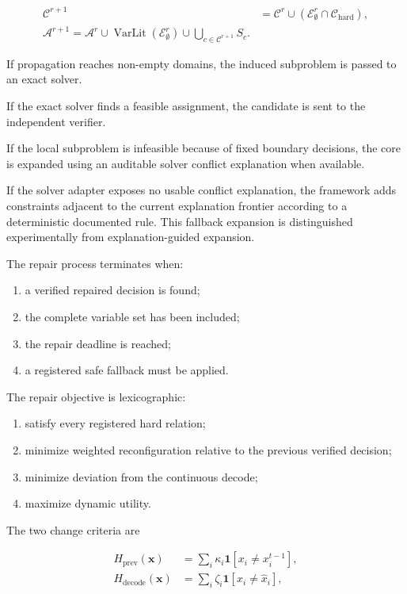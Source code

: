 \documentclass[pdflatex,sn-mathphys-num,iicol,oneside]{sn-jnl}
\begin{document}
\begin{align}
\mathcal{C}^{r+1}
&=
\mathcal{C}^{r}
\cup
\left(
\mathcal{E}_{\emptyset}^{r}
\cap
\mathcal{C}_{\mathrm{hard}}
\right),
\label{eq:constraint-expansion}\\
\mathcal A^{r+1} = \mathcal A^r \cup \operatorname{VarLit}(\mathcal E_\emptyset^r) \cup \bigcup_{c\in\mathcal C^{r+1}}S_c.
\label{eq:variable-expansion}
\end{align}

If propagation reaches non-empty domains, the induced subproblem is
passed to an exact solver.

If the exact solver finds a feasible assignment, the candidate is
sent to the independent verifier.

If the local subproblem is infeasible because of fixed boundary
decisions, the core is expanded using an auditable solver conflict
explanation when available.

If the solver adapter exposes no usable conflict explanation, the
framework adds constraints adjacent to the current explanation
frontier according to a deterministic documented rule. This fallback
expansion is distinguished experimentally from explanation-guided
expansion.

The repair process terminates when:

\begin{enumerate}
    \item a verified repaired decision is found;
    \item the complete variable set has been included;
    \item the repair deadline is reached;
    \item a registered safe fallback must be applied.
\end{enumerate}

The repair objective is lexicographic:

\begin{enumerate}
    \item satisfy every registered hard relation;
    \item minimize weighted reconfiguration relative to the previous
    verified decision;
    \item minimize deviation from the continuous decode;
    \item maximize dynamic utility.
\end{enumerate}

The two change criteria are

\begin{align}
H_{\mathrm{prev}}(\bm{x})
&=
\sum_i
\kappa_i
\mathbf{1}
[x_i\neq x_i^{t-1}],
\label{eq:previous-distance}\\
H_{\mathrm{decode}}(\bm{x})
&=
\sum_i
\zeta_i
\mathbf{1}
[x_i\neq\widehat{x}_i],
\label{eq:decode-distance}
\end{align}
\end{document}

